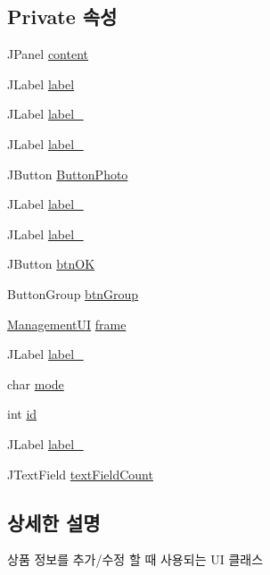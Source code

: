 \subsection*{Private 속성}
\begin{DoxyCompactItemize}
\item 
J\+Panel \hyperlink{classpkg_1_1_product_u_i_a4b906446ebd18ba32a11ace86f26fe12}{content}
\item 
J\+Label \hyperlink{classpkg_1_1_product_u_i_a0ef17a87fd778365f5e24e38081a1ea8}{label}
\item 
J\+Label \hyperlink{classpkg_1_1_product_u_i_a77b14da002223a885455d165ca197069}{label\+\_}
\item 
J\+Label \hyperlink{classpkg_1_1_product_u_i_aa6f63b0826c3405cf68c4b8e68ca07ed}{label\+\_}
\item 
J\+Button \hyperlink{classpkg_1_1_product_u_i_a8d114c269e1d1294e82573b7e54e4c54}{Button\+Photo}
\item 
J\+Label \hyperlink{classpkg_1_1_product_u_i_a34869e36c8a05341ad152117c0abd8b5}{label\+\_}
\item 
J\+Label \hyperlink{classpkg_1_1_product_u_i_accc652eee841b5191b1531a9b6eb8c9e}{label\+\_}
\item 
J\+Button \hyperlink{classpkg_1_1_product_u_i_ae48c36617559f56735461306acc07166}{btn\+OK}
\item 
Button\+Group \hyperlink{classpkg_1_1_product_u_i_ab210713d01b5e5e2f116bd0367d95d6f}{btn\+Group}
\item 
\hyperlink{classpkg_1_1_management_u_i}{Management\+UI} \hyperlink{classpkg_1_1_product_u_i_a49f9ae805cdac34c866e6c1593b6e625}{frame}
\item 
J\+Label \hyperlink{classpkg_1_1_product_u_i_a15bb6a2e073f1c9db2fd7289afd4dd5e}{label\+\_}
\item 
char \hyperlink{classpkg_1_1_product_u_i_a345f05a195b28c741bb8227ded5873fa}{mode}
\item 
int \hyperlink{classpkg_1_1_product_u_i_a1a30802c3dfbd189c88585ed515b78c9}{id}
\item 
J\+Label \hyperlink{classpkg_1_1_product_u_i_abb15458ba8937c88a1f759023182929b}{label\+\_}
\item 
J\+Text\+Field \hyperlink{classpkg_1_1_product_u_i_ac35d0e67c152e5bcc6cdf3b9cc79f90b}{text\+Field\+Count}
\end{DoxyCompactItemize}


\subsection{상세한 설명}
상품 정보를 추가/수정 할 때 사용되는 UI 클래스 

